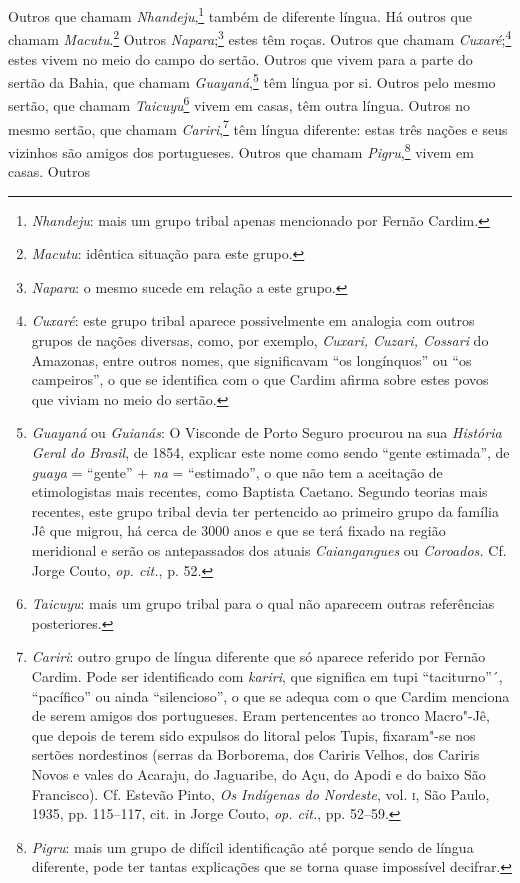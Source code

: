  Outros que chamam \textit{Nhandeju},\footnote{ \textit{Nhandeju}: 
mais um grupo tribal apenas mencionado por Fernão Cardim.} 
também de diferente língua. Há outros que chamam 
\textit{Macutu}.\footnote{ \textit{Macutu}: idêntica situação para este
grupo.} Outros \textit{Napara};\footnote{ \textit{Napara}: o
mesmo sucede em relação a este grupo.} estes têm roças. Outros
que chamam \textit{Cuxaré};\footnote{ \textit{Cuxaré}: este grupo
tribal aparece possivelmente em analogia com outros grupos de nações
diversas, como, por exemplo, \textit{Cuxari, Cuzari, Cossari} do
Amazonas, entre outros nomes, que significavam ``os longínquos'' ou ``os
campeiros'', o que se identifica com o que Cardim afirma sobre estes
povos que viviam no meio do sertão.} estes vivem no meio do
campo do sertão. Outros que vivem para a parte do sertão da Bahia, que
chamam \textit{Guayaná},\footnote{ \textit{Guayaná} ou \textit{Guianás}: 
O Visconde de Porto Seguro procurou na sua \textit{História Geral
do Brasil}, de 1854, explicar este nome como sendo ``gente estimada'', de
\textit{guaya} = ``gente'' + \textit{na} = ``estimado'', o que não tem a
aceitação de etimologistas mais recentes, como Baptista Caetano.
Segundo teorias mais recentes, este grupo tribal devia ter pertencido ao
primeiro grupo da família Jê que migrou, há cerca de 3000 anos e que se
terá fixado na região meridional e serão os antepassados dos atuais
\textit{Caiangangues} ou \textit{Coroados.} Cf. Jorge Couto,
\textit{op. cit.}, p. 52.} têm língua por si. Outros
pelo mesmo sertão, que chamam \textit{Taicuyu}\footnote{ \textit{Taicuyu}: 
mais um grupo tribal para o qual não aparecem outras
referências posteriores.} vivem em casas, têm outra língua.
Outros no mesmo sertão, que chamam \textit{Cariri},\footnote{ \textit{Cariri}: 
outro grupo de língua diferente que só aparece
referido por Fernão Cardim. Pode ser identificado com \textit{kariri}, 
que significa em tupi ``taciturno''´, ``pacífico'' ou ainda ``silencioso'',
o que se adequa com o que Cardim menciona de serem amigos dos
portugueses. Eram pertencentes ao tronco Macro"-Jê, que depois de terem
sido expulsos do litoral pelos Tupis, fixaram"-se nos sertões
nordestinos (serras da Borborema, dos Cariris Velhos, dos Cariris Novos
e vales do Acaraju, do Jaguaribe, do Açu, do Apodi e do baixo São
Francisco). Cf. Estevão Pinto, \textit{Os Indígenas do Nordeste}, vol.
\textsc{i}, São Paulo, 1935, pp. 115--117, cit. in Jorge Couto, \textit{op. cit.}, 
pp. 52--59.} têm língua diferente: estas três nações e seus
vizinhos são amigos dos portugueses. Outros que chamam \textit{Pigru},\footnote{ \textit{Pigru}: 
mais um grupo de difícil identificação
até porque sendo de língua diferente, pode ter tantas explicações que
se torna quase impossível decifrar.} vivem em casas. Outros
